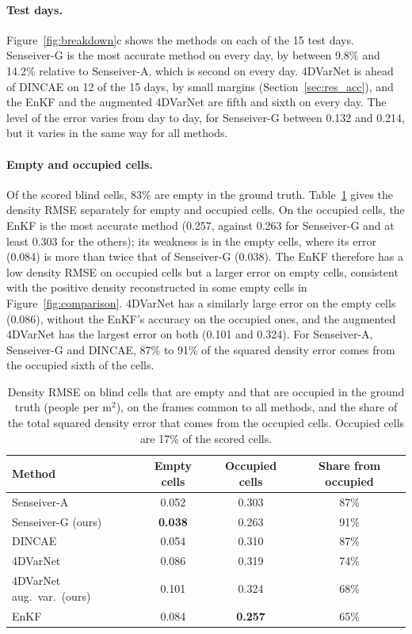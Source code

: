 \documentclass[english, 12pt, a4paper, elec, utf8, a-2b, online]{aaltothesis}
\begin{document}
\paragraph{Test days.}
Figure~\ref{fig:breakdown}c shows the methods on each of the 15 test days.
Senseiver\nobreakdash-G is the most accurate method on every day, by between 9.8\% and
14.2\% relative to Senseiver\nobreakdash-A, which is second on every day. 4DVarNet is ahead
of DINCAE on 12 of the 15 days, by small margins (Section~\ref{sec:res_acc}),
and the EnKF and the augmented 4DVarNet are fifth and sixth on every day. The
level of the error varies from day to day, for Senseiver\nobreakdash-G between 0.132 and
0.214, but it varies in the same way for all methods.

\paragraph{Empty and occupied cells.}
Of the scored blind cells, 83\% are empty in the ground truth.
Table~\ref{tab:occupancy} gives the density RMSE separately for empty and
occupied cells. On the occupied cells, the EnKF is the most accurate method
(0.257, against 0.263 for Senseiver\nobreakdash-G and at least 0.303 for the others); its
weakness is in the empty cells, where its error (0.084) is more than twice that
of Senseiver\nobreakdash-G (0.038). The EnKF therefore has a low density RMSE on occupied
cells but a larger error on empty cells, consistent with the positive density
reconstructed in some empty cells in
Figure~\ref{fig:comparison}. 4DVarNet has a similarly large error on the empty
cells (0.086), without the EnKF's accuracy on the occupied ones, and the
augmented 4DVarNet has the largest error on both (0.101 and 0.324). For
Senseiver\nobreakdash-A, Senseiver\nobreakdash-G and DINCAE, 87\% to 91\% of the squared density error
comes from the occupied sixth of the cells.

\begin{table}[htb]
	\centering
	\caption{Density RMSE on blind cells that are empty and that are occupied in
	the ground truth (people per m$^2$), on the frames common to all methods, and
	the share of the total squared density error that comes from the occupied
	cells. Occupied cells are 17\% of the scored cells.}
	\label{tab:occupancy}
	\small
	\begin{tabular}{lccc}
		\hline
		Method & Empty cells & Occupied cells & Share from occupied \\
		\hline
		Senseiver\nobreakdash-A                 & 0.052 & 0.303 & 87\% \\
		Senseiver\nobreakdash-G (ours)          & \textbf{0.038} & 0.263 & 91\% \\
		DINCAE                      & 0.054 & 0.310 & 87\% \\
		4DVarNet                    & 0.086 & 0.319 & 74\% \\
		4DVarNet aug.\ var.\ (ours) & 0.101 & 0.324 & 68\% \\
		EnKF                        & 0.084 & \textbf{0.257} & 65\% \\
		\hline
	\end{tabular}
\end{table}
\end{document}
